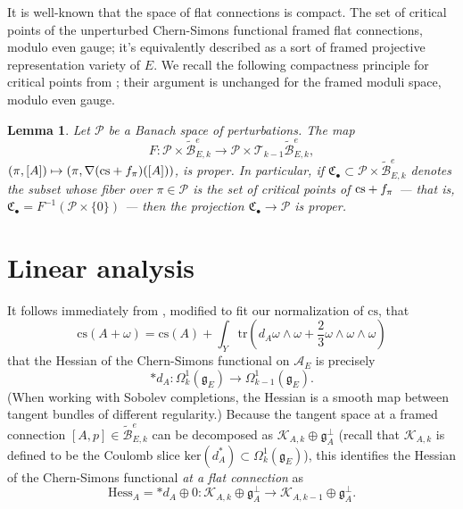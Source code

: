 \documentclass[10pt,a4paper]{amsart}
\newtheorem{lemma}[theorem]{Lemma}
\theoremstyle{definition}
\theoremstyle{remark}
\numberwithin{figure}{qchap}
\begin{document}
It is well-known that the space of flat connections is compact. The set of critical points of the unperturbed Chern-Simons functional framed flat connections, modulo even gauge; it's equivalently described as a sort of framed projective representation variety of $E$. We recall the following compactness principle for critical points from \cite[Lemma~3.8]{KM1}; their argument is unchanged for the framed moduli space, modulo even gauge.

\begin{lemma}\label{prop1}Let $\mathcal P$ be a Banach space of perturbations. The map $$F: \mathcal P \times \widetilde{\mathcal B}^e_{E,k} \to \mathcal P \times \mathcal T_{k-1} \widetilde{\mathcal B}^e_{E,k},$$  $(\pi, [A]) \mapsto (\pi, \nabla(\textup{cs}+f_\pi)([A]))$, is proper. In particular, if $\mathfrak C_\bullet \subset \mathcal P \times \widetilde{\mathcal B}^e_{E,k}$ denotes the subset whose fiber over $\pi \in \mathcal P$ is the set of critical points of $\textup{cs} + f_\pi$ --- that is, $\mathfrak C_\bullet = F^{-1}(\mathcal P \times \{0\})$ --- then the projection $\mathfrak C_\bullet \to \mathcal P$ is proper.
\end{lemma}

\section{Linear analysis}\label{sec:3d-linear}
It follows immediately from \cite[Equation~2.18]{Don}, modified to fit our normalization of $\text{cs}$, that $$\text{cs}(A+\omega) = \text{cs}(A) + \int_Y \text{tr}(d_A \omega \wedge \omega + \frac 23 \omega \wedge \omega \wedge \omega)$$ that the Hessian of the Chern-Simons functional on $\mathcal A_E$ is precisely 
$$*d_A: \Omega^1_k(\mathfrak g_E) \to \Omega^1_{k-1}(\mathfrak g_E).$$ 
(When working with Sobolev completions, the Hessian is a smooth map between tangent bundles of different regularity.) Because the tangent space at a framed connection $[A,p] \in \widetilde{\mathcal B}^e_{E,k}$ can be decomposed as $\mathcal K_{A,k} \oplus \mathfrak g_A^\perp$ (recall that $\mathcal K_{A,k}$ is defined to be the Coulomb slice $\text{ker}(d_A^*) \subset \Omega^1_k(\mathfrak g_E)$), this identifies the Hessian of the Chern-Simons functional \emph{at a flat connection} as 
$$\text{Hess}_A = *d_A \oplus 0: \mathcal K_{A,k} \oplus \mathfrak g_A^\perp \to \mathcal K_{A,k-1} \oplus \mathfrak g_A^\perp.$$ 
\end{document}
